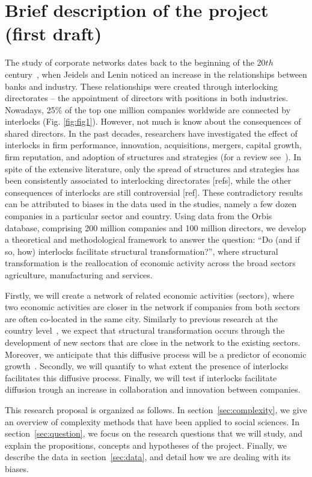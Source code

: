 \section{Brief description of the project (first draft)}
\label{sec:description}
The study of corporate networks dates back to the beginning of the 20$th$ century~\citep{jeidels1905,Lenin1917},
when Jeidels and Lenin noticed an increase in the relationships between banks and industry. 
These relationships were created through interlocking directorates -- the appointment of directors with positions in both industries.
Nowadays, 25\% of the top one million companies worldwide are connected by interlocks (Fig. \ref{fig:fig1}).
However, not much is know about the consequences of shared directors.
In the past decades, researchers have investigated the effect of interlocks in firm performance, innovation, acquisitions, mergers, capital growth, firm reputation, and adoption of structures and strategies (for a review see~\cite{Mizruchi1996}).
In spite of the extensive literature,  
only the spread of structures and strategies has been consistently associated to interlocking directorates [refs],
while the other consequences of interlocks are still controversial [ref].
These contradictory results can be attributed to biases in the data used in the studies,
namely a few dozen companies in a particular sector and country.
Using data from the Orbis database, 
comprising 200 million companies and 100 million directors, 
we develop a theoretical and methodological framework to answer the question:
``Do (and if so, how) interlocks facilitate structural transformation?'',
where structural transformation is the reallocation of economic activity across the broad sectors agriculture, manufacturing and services.

Firstly, we will create a network of related economic activities (sectors),
where two economic activities are closer in the network if companies from both sectors are often co-located in the same city.
Similarly to previous research at the country level~\cite{hidalgo2007, hausmann2011, Hausmann2006,hidalgo2009}, 
we expect that structural transformation occurs through the development of new sectors that are close in the network to the existing sectors.
Moreover, we anticipate that this diffusive process will be a predictor of economic growth~\cite{hidalgo2009}.
Secondly, we will quantify to what extent the presence of interlocks facilitates this diffusive process.
Finally, we will test if interlocks facilitate diffusion trough an increase in collaboration and innovation between companies.


This research proposal is organized as follows. 
In section~\ref{sec:complexity}, we give an overview of complexity methods that have been applied to social sciences.
In section~\ref{sec:question}, we focus on the research questions that we will study,
and explain the propositions, concepts and hypotheses of the project.
Finally, we describe the data in section~\ref{sec:data}, and detail how we are dealing with its biases.



